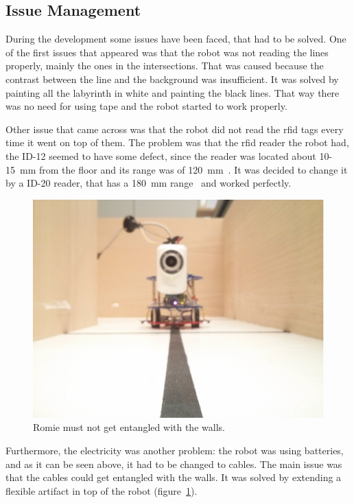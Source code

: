 \subsection{Issue Management}

During the development some issues have been faced, that had to be solved. One of the first issues
that appeared was that the robot was not reading the lines properly, mainly the ones in the
intersections. That was caused because the contrast between the line and the background was
insufficient. It was solved by painting all the labyrinth in white and painting the black lines.
That way there was no need for using tape and the robot started to work properly.

Other issue that came across was that the robot did not read the \acrshort{rfid} tags every time it
went on top of them. The problem was that the \acrshort{rfid} reader the robot had, the ID-12 seemed
to have some defect, since the reader was located about 10-15~mm from the floor and its range was of
120~mm~\cite{rfid}. It was decided to change it by a ID-20 reader, that has a 180~mm
range~\cite{rfid} and worked perfectly.

\begin{figure}[!htbp]
	\centering
	\includegraphics[height=0.35\textheight]{fig/lines.jpg}
	\caption{Romie must not get entangled with the walls.}
	\label{fig:lines}
\end{figure}

Furthermore, the electricity was another problem: the robot was using batteries, and as it can be
seen above, it had to be changed to cables. The main issue was that the cables could get entangled
with the walls. It was solved by extending a flexible artifact in top of the robot
(figure~\ref{fig:lines}).

